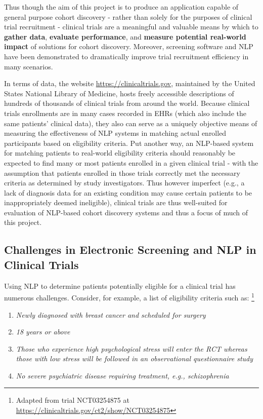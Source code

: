 \documentclass[../main.tex]{subfiles}
\begin{document}
Thus though the aim of this project is to produce an application capable of general purpose cohort discovery - rather than solely for the purposes of clinical trial recruitment - clinical trials are a meaningful and valuable means by which to \textbf{gather data}, \textbf{evaluate performance}, and \textbf{measure potential real-world impact} of solutions for cohort discovery. Moreover, screening software and NLP have been demonstrated to dramatically improve trial recruitment efficiency in many scenarios.

In terms of data, the website \url{https://clinicaltrials.gov}, maintained by the United States National Library of Medicine, hosts freely accessible descriptions of hundreds of thousands of clinical trials from around the world. Because clinical trials enrollments are in many cases recorded in EHRs (which also include the same patients' clinical data), they also can serve as a uniquely objective means of measuring the effectiveness of NLP systems in matching actual enrolled participants based on eligibility criteria. Put another way, an NLP-based system for matching patients to real-world eligibility criteria should reasonably be expected to find many or most patients enrolled in a given clinical trial - with the assumption that patients enrolled in those trials correctly met the necessary criteria as determined by study investigators. Thus however imperfect (e.g., a lack of diagnosis data for an existing condition may cause certain patients to be inappropriately deemed ineligible), clinical trials are thus well-suited for evaluation of NLP-based cohort discovery systems and thus a focus of much of this project.

\subsection{Challenges in Electronic Screening and NLP in Clinical Trials}

Using NLP to determine patients potentially eligible for a clinical trial has numerous challenges. Consider, for example, a list of eligibility criteria such as: \footnote{Adapted from trial NCT03254875 at \url{https://clinicaltrials.gov/ct2/show/NCT03254875}}

\begin{enumerate}
    \itemsep0em 
    \item \textit{Newly diagnosed with breast cancer and scheduled for surgery}
    \item \textit{18 years or above}
    \item \textit{Those who experience high psychological stress will enter the RCT whereas those with low stress will be followed in an observational questionnaire study}
    \item \textit{No severe psychiatric disease requiring treatment, e.g., schizophrenia}
\end{enumerate}
\end{document}
